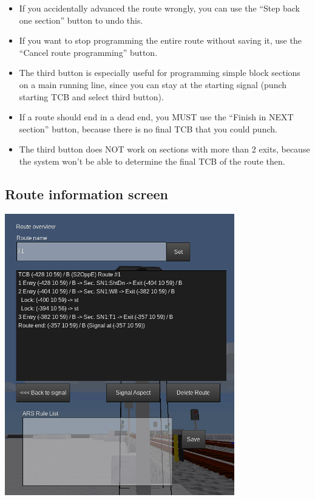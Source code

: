 \documentclass[english]{paper}
\begin{document}
\begin{itemize}
\item If you accidentally advanced the route wrongly, you can use the ``Step
back one section'' button to undo this.
\item If you want to stop programming the entire route without saving it,
use the ``Cancel route programming'' button.
\item The third button is especially useful for programming simple block
sections on a main running line, since you can stay at the starting
signal (punch starting TCB and select third button).
\item If a route should end in a dead end, you MUST use the ``Finish in
NEXT section'' button, because there is no final TCB that you could
punch.
\item The third button does NOT work on sections with more than 2 exits,
because the system won't be able to determine the final TCB of the
route then.
\end{itemize}

\subsection{Route information screen}

\includegraphics[width=10cm]{10_home_moritz_Home_Projekte_Minetest_minetest_____lyx_img_Bildschirmfoto_2019-01-15_19-28-09.png}
\end{document}
